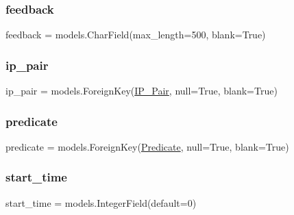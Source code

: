 \mbox{\label{classdynamicfilterapp_1_1models_1_1_task_aecc50b4643d1ea45de7afe20e729c160}} 
\subsubsection{\texorpdfstring{feedback}{feedback}}
{\footnotesize\ttfamily feedback = models.\+Char\+Field(max\+\_\+length=500, blank=True)\hspace{0.3cm}{\ttfamily [static]}}

\mbox{\label{classdynamicfilterapp_1_1models_1_1_task_a6a81c84f60e4fc0f40d6812d6f6452c7}} 
\subsubsection{\texorpdfstring{ip\_pair}{ip\_pair}}
{\footnotesize\ttfamily ip\+\_\+pair = models.\+Foreign\+Key(\mbox{\hyperlink{classdynamicfilterapp_1_1models_1_1_i_p___pair}{I\+P\+\_\+\+Pair}}, null=True, blank=True)\hspace{0.3cm}{\ttfamily [static]}}

\mbox{\label{classdynamicfilterapp_1_1models_1_1_task_a59edc4e3874fffd0c2a9ef88cddfc0fa}} 
\subsubsection{\texorpdfstring{predicate}{predicate}}
{\footnotesize\ttfamily predicate = models.\+Foreign\+Key(\mbox{\hyperlink{classdynamicfilterapp_1_1models_1_1_predicate}{Predicate}}, null=True, blank=True)\hspace{0.3cm}{\ttfamily [static]}}

\mbox{\label{classdynamicfilterapp_1_1models_1_1_task_a2530c3908f0179486a4c2255f792e27a}} 
\subsubsection{\texorpdfstring{start\_time}{start\_time}}
{\footnotesize\ttfamily start\+\_\+time = models.\+Integer\+Field(default=0)\hspace{0.3cm}{\ttfamily [static]}}

